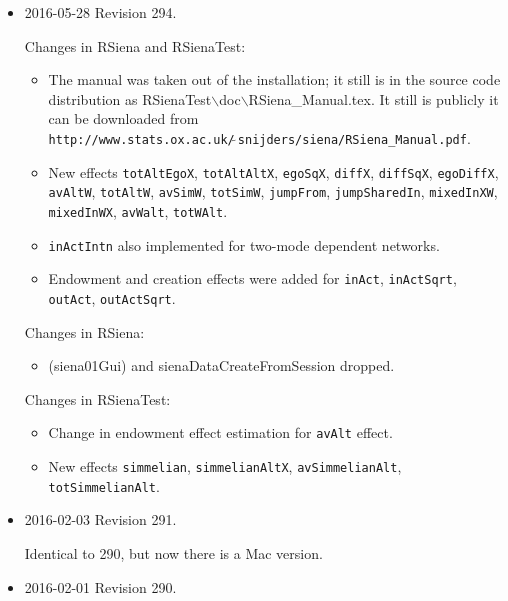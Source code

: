 \documentclass[a4paper,fleqn,11pt]{article}
\newcommand{\+}{\, + \,}
\newcommand{\sfn}[1]{\textsf{#1}}
\begin{document}
\begin{small}
\begin{itemize}
\item 2016-05-28 Revision 294.

Changes in \textsf{RSiena} and \textsf{RSienaTest}:
\begin{itemize}
   \item The manual was taken out of the installation;
   it still is in the source code distribution as
   \textsf{RSienaTest}{$\backslash$}doc{$\backslash$}RSiena\_Manual.tex. It still is publicly
   it can be downloaded from \\
{\texttt{http://www.stats.ox.ac.uk/$\tilde{\ }$snijders/siena/RSiena\_Manual.pdf}}.
   \item New effects  \texttt{totAltEgoX}, \texttt{totAltAltX}, \texttt{egoSqX},
     \texttt{diffX}, \texttt{diffSqX}, \texttt{egoDiffX},
     \texttt{avAltW}, \texttt{totAltW}, \texttt{avSimW},
     \texttt{totSimW}, \texttt{jumpFrom}, \texttt{jumpSharedIn},
     \texttt{mixedInXW}, \texttt{mixedInWX},
     \texttt{avWalt},  \texttt{totWAlt}.
   \item \texttt{inActIntn} also implemented for two-mode dependent networks.
   \item Endowment and creation effects were added for
       \texttt{inAct}, \texttt{inActSqrt}, \texttt{outAct}, \texttt{outActSqrt}.
\end{itemize}
Changes in RSiena:
\begin{itemize}
   \item \sfn{(siena01Gui)} and \sfn{sienaDataCreateFromSession} dropped.
\end{itemize}
Changes in \textsf{RSienaTest}:
\begin{itemize}
 \item Change in endowment effect estimation for \texttt{avAlt} effect.
   \item New effects
     \texttt{simmelian}, \texttt{simmelianAltX}, \texttt{avSimmelianAlt},
      \texttt{totSimmelianAlt}.
\end{itemize}

\item 2016-02-03 Revision 291.

Identical to 290, but now there is a Mac version.

\item 2016-02-01 Revision 290.


\end{itemize}
\end{small}
\end{document}
